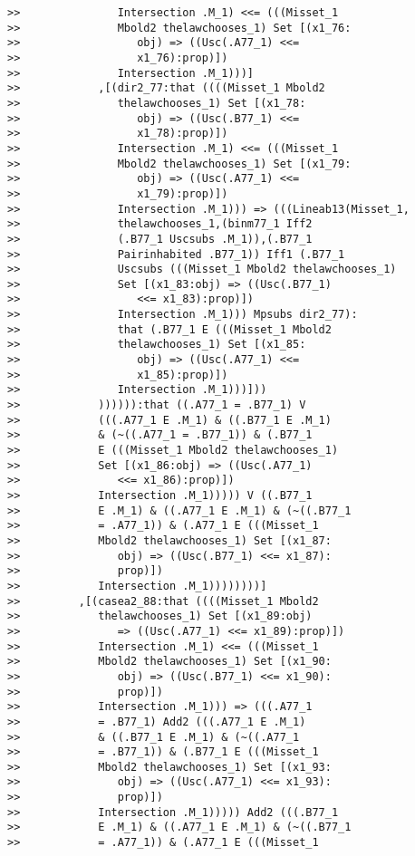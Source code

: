 \documentclass[12pt]{article}
\begin{document}
\begin{verbatim}
>>               Intersection .M_1) <<= (((Misset_1
>>               Mbold2 thelawchooses_1) Set [(x1_76:
>>                  obj) => ((Usc(.A77_1) <<=
>>                  x1_76):prop)])
>>               Intersection .M_1)))]
>>            ,[(dir2_77:that ((((Misset_1 Mbold2
>>               thelawchooses_1) Set [(x1_78:
>>                  obj) => ((Usc(.B77_1) <<=
>>                  x1_78):prop)])
>>               Intersection .M_1) <<= (((Misset_1
>>               Mbold2 thelawchooses_1) Set [(x1_79:
>>                  obj) => ((Usc(.A77_1) <<=
>>                  x1_79):prop)])
>>               Intersection .M_1))) => (((Lineab13(Misset_1,
>>               thelawchooses_1,(binm77_1 Iff2
>>               (.B77_1 Uscsubs .M_1)),(.B77_1
>>               Pairinhabited .B77_1)) Iff1 (.B77_1
>>               Uscsubs (((Misset_1 Mbold2 thelawchooses_1)
>>               Set [(x1_83:obj) => ((Usc(.B77_1)
>>                  <<= x1_83):prop)])
>>               Intersection .M_1))) Mpsubs dir2_77):
>>               that (.B77_1 E (((Misset_1 Mbold2
>>               thelawchooses_1) Set [(x1_85:
>>                  obj) => ((Usc(.A77_1) <<=
>>                  x1_85):prop)])
>>               Intersection .M_1)))]))
>>            )))))):that ((.A77_1 = .B77_1) V
>>            (((.A77_1 E .M_1) & ((.B77_1 E .M_1)
>>            & (~((.A77_1 = .B77_1)) & (.B77_1
>>            E (((Misset_1 Mbold2 thelawchooses_1)
>>            Set [(x1_86:obj) => ((Usc(.A77_1)
>>               <<= x1_86):prop)])
>>            Intersection .M_1))))) V ((.B77_1
>>            E .M_1) & ((.A77_1 E .M_1) & (~((.B77_1
>>            = .A77_1)) & (.A77_1 E (((Misset_1
>>            Mbold2 thelawchooses_1) Set [(x1_87:
>>               obj) => ((Usc(.B77_1) <<= x1_87):
>>               prop)])
>>            Intersection .M_1))))))))]
>>         ,[(casea2_88:that ((((Misset_1 Mbold2
>>            thelawchooses_1) Set [(x1_89:obj)
>>               => ((Usc(.A77_1) <<= x1_89):prop)])
>>            Intersection .M_1) <<= (((Misset_1
>>            Mbold2 thelawchooses_1) Set [(x1_90:
>>               obj) => ((Usc(.B77_1) <<= x1_90):
>>               prop)])
>>            Intersection .M_1))) => (((.A77_1
>>            = .B77_1) Add2 (((.A77_1 E .M_1)
>>            & ((.B77_1 E .M_1) & (~((.A77_1
>>            = .B77_1)) & (.B77_1 E (((Misset_1
>>            Mbold2 thelawchooses_1) Set [(x1_93:
>>               obj) => ((Usc(.A77_1) <<= x1_93):
>>               prop)])
>>            Intersection .M_1))))) Add2 (((.B77_1
>>            E .M_1) & ((.A77_1 E .M_1) & (~((.B77_1
>>            = .A77_1)) & (.A77_1 E (((Misset_1

\end{verbatim}
\end{document}
